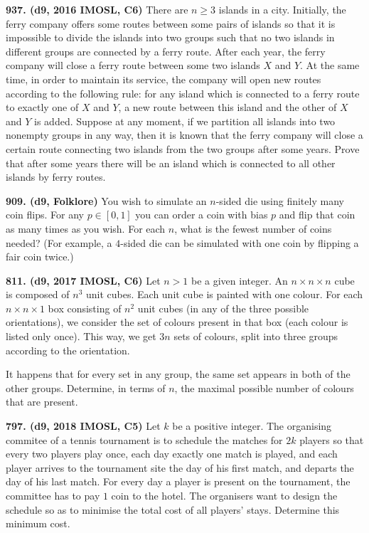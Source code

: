 \documentclass{article}
\begin{document}
\textbf{937. (\color{red}d9\color{black}, 2016 IMOSL, C6)} There are $n \geq 3$ islands in a city. Initially, the ferry company offers some routes between some pairs of islands so that it is impossible to divide the islands into two groups such that no two islands in different groups are connected by a ferry route.
\smallbreak
After each year, the ferry company will close a ferry route between some two islands $X$ and $Y$. At the same time, in order to maintain its service, the company will open new routes according to the following rule: for any island which is connected to a ferry route to exactly one of $X$ and $Y$, a new route between this island and the other of $X$ and $Y$ is added.
\smallbreak
Suppose at any moment, if we partition all islands into two nonempty groups in any way, then it is known that the ferry company will close a certain route connecting two islands from the two groups after some years. Prove that after some years there will be an island which is connected to all other islands by ferry routes.

\textbf{909. (\color{red}d9\color{black}, Folklore)} You wish to simulate an $n$-sided die using finitely many coin flips. For any $p \in [0, 1]$ you can order a coin with bias $p$ and flip that coin as many times as you wish. For each $n$, what is the fewest number of coins needed? (For example, a $4$-sided die can be simulated with one coin by flipping a fair coin twice.)

\textbf{811. (\color{red}d9\color{black}, 2017 IMOSL, C6)} Let $n > 1$ be a given integer. An $n \times n \times n$ cube is composed of $n^3$ unit cubes. Each unit cube is painted with one colour. For each $n \times n \times 1$ box consisting of $n^2$ unit cubes (in any of the three possible orientations), we consider the set of colours present in that box (each colour is listed only once). This way, we get $3n$ sets of colours, split into three groups according to the orientation.

It happens that for every set in any group, the same set appears in both of the other groups. Determine, in terms of $n$, the maximal possible number of colours that are present.

\textbf{797. (\color{red}d9\color{black}, 2018 IMOSL, C5)} Let $k$ be a positive integer. The organising commitee of a tennis tournament is to schedule the matches for $2k$ players so that every two players play once, each day exactly one match is played, and each player arrives to the tournament site the day of his first match, and departs the day of his last match. For every day a player is present on the tournament, the committee has to pay $1$ coin to the hotel. The organisers want to design the schedule so as to minimise the total cost of all players' stays. Determine this minimum cost.
\end{document}
